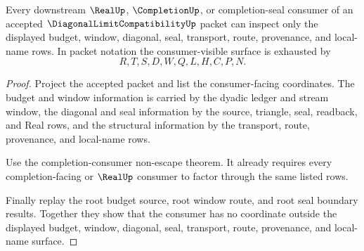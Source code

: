 \begin{theorem}
\label{thm:diagonal-limit-compatibility-root-consumer-nonescape}
Every downstream $\RealUp$, $\CompletionUp$, or completion-seal consumer of an
accepted $\DiagonalLimitCompatibilityUp$ packet can inspect only the displayed
budget, window, diagonal, seal, transport, route, provenance, and local-name
rows. In packet notation the consumer-visible surface is exhausted by
$$
R,T,S,D,W,Q,L,H,C,P,N.
$$
\end{theorem}
\begin{proof}
Project the accepted packet and list the consumer-facing coordinates. The
budget and window information is carried by the dyadic ledger and stream
window, the diagonal and seal information by the source, triangle, seal,
readback, and Real rows, and the structural information by the transport,
route, provenance, and local-name rows.

Use the completion-consumer non-escape theorem. It already requires every
completion-facing or $\RealUp$ consumer to factor through the same listed
rows.

Finally replay the root budget source, root window route, and root seal
boundary results. Together they show that the consumer has no coordinate
outside the displayed budget, window, diagonal, seal, transport, route,
provenance, and local-name surface.
\end{proof}

